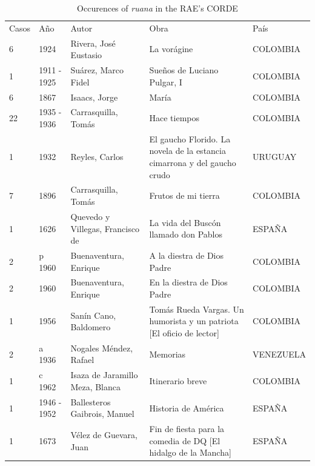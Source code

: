 \begin{table}[ht]
	\centering
	{\tiny
		\caption{Occurences of \textit{ruana} in the RAE's CORDE}
		\label{my-label}
		\begin{tabular}{lllll}
			Casos & Año         & Autor                            & Obra                                                                                    & País      \\
			6     & 1924        & Rivera, José Eustasio            & La vorágine                                                                             & COLOMBIA  \\
			1     & 1911 - 1925 & Suárez, Marco Fidel              & Sueños de Luciano Pulgar, I                                                             & COLOMBIA  \\
			6     & 1867        & Isaacs, Jorge                    & María                                                                                   & COLOMBIA  \\
			22    & 1935 - 1936 & Carrasquilla, Tomás              & Hace tiempos                                                                            & COLOMBIA  \\
			1     & 1932        & Reyles, Carlos                   & El gaucho Florido. La novela de la estancia cimarrona y del gaucho crudo                & URUGUAY   \\
			7     & 1896        & Carrasquilla, Tomás              & Frutos de mi tierra                                                                     & COLOMBIA  \\
			1     & 1626        & Quevedo y Villegas, Francisco de & La vida del Buscón llamado don Pablos                                                   & ESPAÑA    \\
			2     & p 1960      & Buenaventura, Enrique            & A la diestra de Dios Padre                                                              & COLOMBIA  \\
			2     & 1960        & Buenaventura, Enrique            & En la diestra de Dios Padre                                                             & COLOMBIA  \\
			1     & 1956        & Sanín Cano, Baldomero            & Tomás Rueda Vargas. Un humorista y un patriota {[}El oficio de lector{]}                & COLOMBIA  \\
			2     & a 1936      & Nogales Méndez, Rafael           & Memorias                                                                                & VENEZUELA \\
			1     & c 1962      & Isaza de Jaramillo Meza, Blanca  & Itinerario breve                                                                        & COLOMBIA  \\
			1     & 1946 - 1952 & Ballesteros Gaibrois, Manuel     & Historia de América                                                                     & ESPAÑA    \\
			1     & 1673        & Vélez de Guevara, Juan           & Fin de fiesta para la comedia de DQ
			{[}El hidalgo de la Mancha{]} & ESPAÑA   
		\end{tabular}
	}
\end{table}




